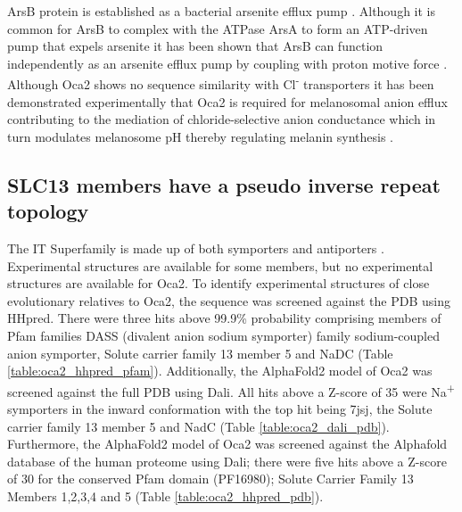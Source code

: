 ArsB protein is established as a bacterial arsenite efflux pump \cite{rosen1999families}. Although it is common for ArsB to complex with the ATPase ArsA to form an ATP-driven pump that expels arsenite \cite{dey1995dual} it has been shown that ArsB can function independently as an arsenite efflux pump by coupling with proton motive force \cite{ji1992regulation}. Although Oca2 shows no sequence similarity with Cl\textsuperscript{-} transporters it has been demonstrated experimentally that Oca2 is required for melanosomal anion efflux contributing to the mediation of chloride-selective anion conductance which in turn modulates melanosome pH thereby regulating melanin synthesis \cite{bellono2014intracellular}.

\subsection{SLC13 members have a pseudo inverse repeat topology}
The IT Superfamily is made up of both symporters and antiporters \cite{sauer2020structural}.  Experimental structures are available for some members, but no experimental structures are available for Oca2. To identify experimental structures of close evolutionary relatives to Oca2, the sequence was screened against the PDB using HHpred. There were three hits above 99.9\% probability comprising members of Pfam families DASS  (divalent anion sodium symporter) family sodium-coupled anion symporter, Solute carrier family 13 member 5 and NaDC (Table \ref{table:oca2_hhpred_pfam}). Additionally, the AlphaFold2 model of Oca2 was screened against the full PDB using Dali. All hits above a Z-score of 35 were Na\textsuperscript{+} symporters in the inward conformation with the top hit being 7jsj, the Solute carrier family 13 member 5 and NadC (Table \ref{table:oca2_dali_pdb}). Furthermore, the AlphaFold2 model of Oca2 was screened against the Alphafold database of the human proteome using Dali; there were five hits above a Z-score of 30 for the conserved Pfam domain (PF16980);  Solute Carrier Family 13 Members 1,2,3,4 and 5 (Table \ref{table:oca2_hhpred_pdb}).


\begin{table}
\caption{HHpred results for screen of Oca2 sequence against PDB}
\label{table:oca2_hhpred_pdb}
\end{table}


